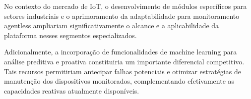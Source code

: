 No contexto do mercado de IoT, o desenvolvimento de módulos específicos para setores industriais e o aprimoramento da adaptabilidade para monitoramento agentless ampliariam significativamente o alcance e a aplicabilidade da plataforma nesses segmentos especializados.

Adicionalmente, a incorporação de funcionalidades de machine learning para análise preditiva e proativa constituiria um importante diferencial competitivo. Tais recursos permitiriam antecipar falhas potenciais e otimizar estratégias de manutenção dos dispositivos monitorados, complementando efetivamente as capacidades reativas atualmente disponíveis.

